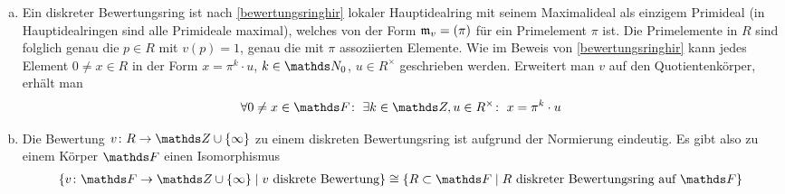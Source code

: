 \documentclass[ngerman,fontsize=11pt, paper=a4, parskip=half, titlepage=true, toc=bib]{scrartcl}
\begin{document}
\begin{Bem}\label{darstellungdbk}
  \begin{enumerate}[a)]
  \item Ein diskreter Bewertungsring ist nach \ref{bewertungsringhir}
    lokaler Hauptidealring mit seinem Maximalideal als einzigem 
    Primideal (in Hauptidealringen sind alle Primideale maximal),
    welches von der Form $\mathfrak{m}_v=(\pi)$ für ein Primelement $\pi$ ist.
    Die Primelemente in $R$ sind folglich genau die $p\in R$ mit $v(p)=1$, 
    genau die mit $\pi$ assoziierten Elemente.
    Wie im Beweis von \ref{bewertungsringhir} kann jedes Element $0\neq x\in R$
    in der Form $x=\pi^k\cdot u$, $k\in\N_0$, $u\in R^\times$ 
    geschrieben werden.
    Erweitert man $v$ auf den Quotientenkörper, erhält man
    \begin{gather*}
      \forall 0\neq x\in \F\colon\;
      \exists k\in\Z, u\in R^\times\colon\; x=\pi^k\cdot u
    \end{gather*}
  \item Die Bewertung $v\colon R\to\Z\cup\{\infty\}$ zu einem diskreten
    Bewertungsring ist aufgrund der Normierung eindeutig.
    Es gibt also zu einem Körper $\F$ einen Isomorphismus
    \begin{gather*}
      \{v\colon \F\to\Z\cup\{\infty\} 
      \mid \text{$v$ diskrete Bewertung}\}
      \cong 
      \{R\subset \F\mid \text{$R$ diskreter Bewertungsring auf $\F$}\}
    \end{gather*}
  \end{enumerate}
\end{Bem}


\end{document}
